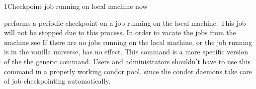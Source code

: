 \begin{ManPage}{}{1}{Checkpoint job running on local machine now}
\label{man-condor-checkpoint-job}
\Synopsis {}

\Description

 preforms a periodic checkpoint on a job running on
the local machine.  This job will not be
stopped due to this process.  In order to vacate the jobs from the machine see
 If there are no jobs running on the local machine, or the job
running is in the vanilla universe,
 has no effect. This command is a more specific version
of the the generic  command.  Users and administrators
shouldn't have to use this command in a properly working condor pool,
since the condor daemons take care of job checkpointing automatically.

\end{ManPage}

